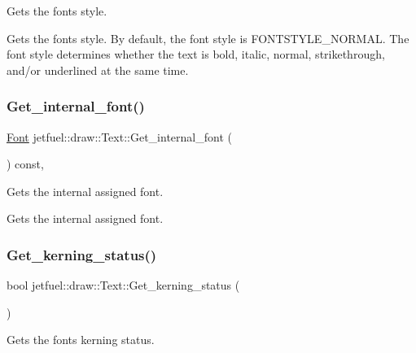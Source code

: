 Gets the font\textquotesingle{}s style. 

Gets the font\textquotesingle{}s style. By default, the font style is F\+O\+N\+T\+S\+T\+Y\+L\+E\+\_\+\+N\+O\+R\+M\+AL. The font style determines whether the text is bold, italic, normal, strikethrough, and/or underlined at the same time. \mbox{\label{classjetfuel_1_1draw_1_1Text_a32e999790061eb568e3c71e23bee7be0}} 
\subsubsection{\texorpdfstring{Get\+\_\+internal\+\_\+font()}{Get\_internal\_font()}}
{\footnotesize\ttfamily \hyperlink{classjetfuel_1_1draw_1_1Font}{Font} jetfuel\+::draw\+::\+Text\+::\+Get\+\_\+internal\+\_\+font (\begin{DoxyParamCaption}{ }\end{DoxyParamCaption}) const\hspace{0.3cm}{\ttfamily [inline]}, {\ttfamily [protected]}}



Gets the internal assigned font. 

Gets the internal assigned font. \mbox{\label{classjetfuel_1_1draw_1_1Text_a35deab301fc970a0f23e490156720776}} 
\subsubsection{\texorpdfstring{Get\+\_\+kerning\+\_\+status()}{Get\_kerning\_status()}}
{\footnotesize\ttfamily bool jetfuel\+::draw\+::\+Text\+::\+Get\+\_\+kerning\+\_\+status (\begin{DoxyParamCaption}{ }\end{DoxyParamCaption})\hspace{0.3cm}{\ttfamily [inline]}}



Gets the font\textquotesingle{}s kerning status. 

